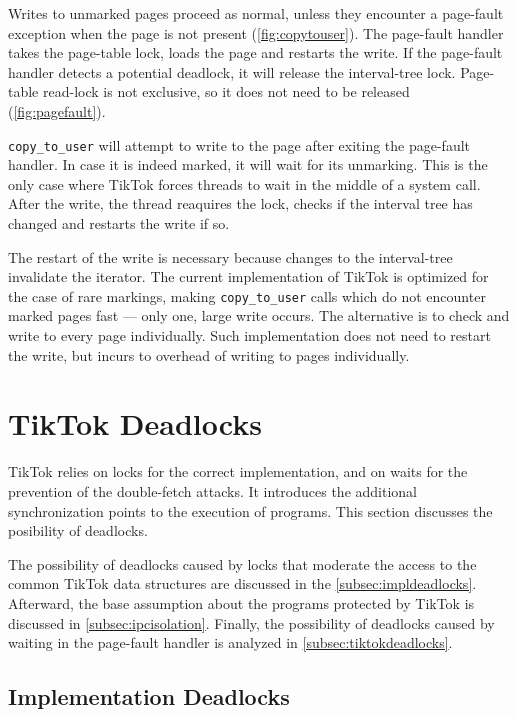 \documentclass[conference]{IEEEtran}
\newcommand{\sysname}{TikTok}
\begin{document}
Writes to unmarked pages proceed as normal, unless they encounter a page-fault
exception when the page is not present (\autoref{fig:copytouser}). The
page-fault handler takes the page-table lock, loads the page and restarts the
write. If the page-fault handler detects a potential deadlock, it will release
the interval-tree lock. Page-table read-lock is not exclusive, so it does not
need to be released (\autoref{fig:pagefault}).

\texttt{copy\_to\_user} will attempt to write to the page after exiting the
page-fault handler. In case it is indeed marked, it will wait for its unmarking.
This is the only case where \sysname{} forces threads to wait in the middle of a
system call. After the write, the thread reaquires the lock, checks if the
interval tree has changed and restarts the write if so.

The restart of the write is necessary because changes to the interval-tree
invalidate the iterator. The current implementation of \sysname{} is optimized for
the case of rare markings, making \texttt{copy\_to\_user} calls which do not
encounter marked pages fast --- only one, large write occurs. The alternative is
to check and write to every page individually. Such implementation does not need
to restart the write, but incurs to overhead of writing to pages individually.

\section{TikTok Deadlocks}
\label{sec:deadlocks}

\sysname{} relies on locks for the correct implementation, and on waits for the
prevention of the double-fetch attacks. It introduces the additional synchronization
points to the execution of programs. This section discusses the posibility of deadlocks.

The possibility of deadlocks caused by locks that moderate the access to the
common \sysname{} data structures are discussed in the
\autoref{subsec:impldeadlocks}. Afterward, the base assumption about the programs
protected by \sysname{} is discussed in \autoref{subsec:ipcisolation}. Finally,
the possibility of deadlocks caused by waiting in the page-fault handler is analyzed
in \autoref{subsec:tiktokdeadlocks}.

\subsection{Implementation Deadlocks}
\label{subsec:impldeadlocks}
\end{document}
